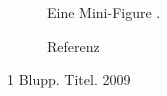 \documentclass{article}
\begin{document}
\begin{figure}
	\centering Eine Mini-Figure \cite{blupp}.
	\caption{Referenz}
\end{figure}
\begin{thebibliography}{1}
		Blupp. \newblock Titel. 2009

\end{thebibliography}
\end{document}
